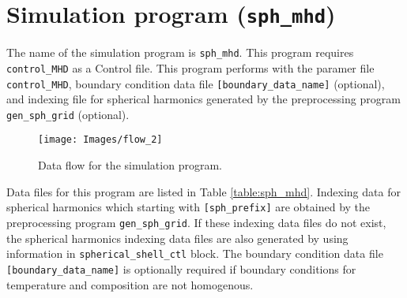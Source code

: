 \newpage
%

\section{Simulation program ({\tt sph\_mhd})}
\label{section:sph_mhd}
%

The name of the simulation program is {\tt sph\_mhd}. This program requires {\tt control\_MHD} as a Control file. This program performs with the paramer file {\tt control\_MHD}, boundary condition data file \verb|[boundary_data_name]| (optional), and  indexing file for spherical harmonics generated by the preprocessing program {\tt gen\_sph\_grid} (optional).
%
\begin{figure}[htbp]
\begin{center}
\texttt{[image: Images/flow\_2]}
\end{center}
\caption{Data flow for the simulation program.}
\label{fig:flow_2}
\end{figure}
%
Data files for this program are listed in Table \ref{table:sph_mhd}. Indexing data for spherical harmonics which starting with \verb|[sph_prefix]| are obtained by the preprocessing program \verb|gen_sph_grid|. If these indexing data files do not exist, the spherical harmonics indexing data files are also generated by using information in \verb|spherical_shell_ctl| block. The boundary condition data file \verb|[boundary_data_name]| is optionally required if boundary conditions for temperature and composition are not homogenous.
%
